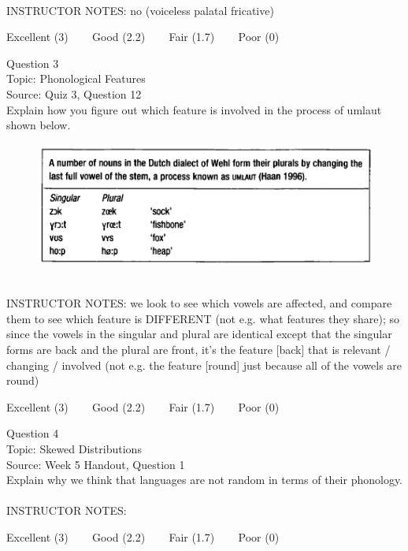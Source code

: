 \documentclass[12pt]{article}
\begin{document}
~\\
INSTRUCTOR NOTES: no (voiceless palatal fricative)


\vfill
Excellent (3) ~~~ Good (2.2) ~~~ Fair (1.7) ~~~ Poor (0)
\newpage

{\large Question 3}\\

Topic: Phonological Features\\
Source: Quiz 3, Question 12\\

Explain how you figure out which feature is involved in the process of umlaut shown below.\\

\begin{figure}[H]
\includegraphics{../images/dutch.png}
\end{figure}

~\\
INSTRUCTOR NOTES: we look to see which vowels are affected, and compare them to see which feature is DIFFERENT (not e.g. what features they share); so since the vowels in the singular and plural are identical except that the singular forms are back and the plural are front, it's the feature [back] that is relevant / changing / involved (not e.g. the feature [round] just because all of the vowels are round)


\vfill
Excellent (3) ~~~ Good (2.2) ~~~ Fair (1.7) ~~~ Poor (0)
\newpage

{\large Question 4}\\

Topic: Skewed Distributions\\
Source: Week 5 Handout, Question 1\\

Explain why we think that languages are not random in terms of their phonology.\\


~\\
INSTRUCTOR NOTES: 


\vfill
Excellent (3) ~~~ Good (2.2) ~~~ Fair (1.7) ~~~ Poor (0)
\newpage
\end{document}

